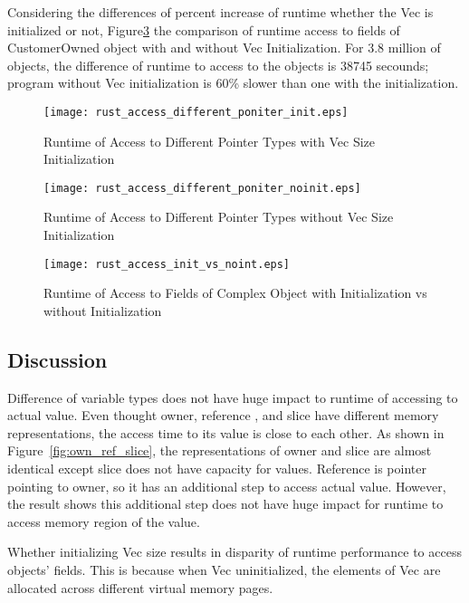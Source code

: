 Considering the differences of percent increase of runtime whether the Vec is initialized or not, 
Figure\ref{fig:init_vs_noinit} the comparison of runtime access to fields of CustomerOwned object with and without Vec Initialization.
For 3.8 million of objects, the difference of runtime to access to the objects is 38745 secounds; program without Vec initialization is 60\% slower than one with the initialization.

\begin{figure}[htb]
    \texttt{[image: rust\_access\_different\_poniter\_init.eps]}
    \caption{Runtime of Access to Different Pointer Types with Vec Size Initialization}
    \label{fig:rustaccessinit}
\end{figure}

\begin{figure}[htb]
    \texttt{[image: rust\_access\_different\_poniter\_noinit.eps]}
    \caption{Runtime of Access to Different Pointer Types without Vec Size Initialization}
    \label{fig:rustaccessnoinit}
\end{figure}

\begin{figure}[htb]
    \texttt{[image: rust\_access\_init\_vs\_noint.eps]}
    \caption{Runtime of Access to Fields of Complex Object with Initialization vs without Initialization}
    \label{fig:init_vs_noinit}
\end{figure}

\subsection{Discussion}
\label{sec:history}
Difference of variable types does not have huge impact to runtime of accessing to actual value.
Even thought owner, reference , and slice have different memory representations, the access time to its value is 
close to each other. As shown in Figure~\ref{fig:own_ref_slice}, the representations of owner and slice are almost identical except slice does not have capacity for values.
Reference is pointer pointing to owner, so it has an additional step to access actual value. 
However, the result shows this additional step does not have huge impact for runtime to access memory region of the value.

Whether initializing Vec size results in disparity of runtime performance to access objects' fields. 
This is because when Vec uninitialized, the elements of Vec are allocated across different virtual memory pages.

